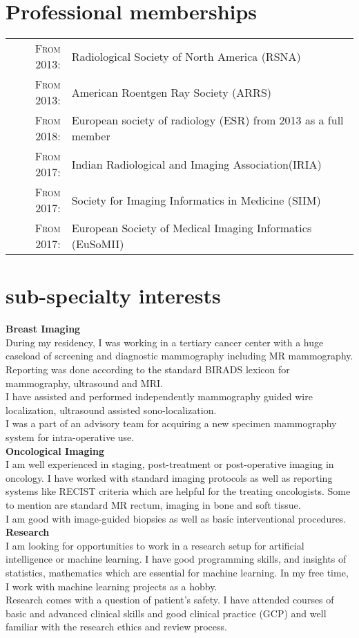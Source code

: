 \documentclass[a4paper,10pt]{article}
\begin{document}
\section{Professional memberships}
\begin{tabular}{rl}
\textsc{From 2013:}&Radiological Society of North America (RSNA)\\
\textsc{From 2013:}&American Roentgen Ray Society (ARRS)\\
\textsc{From 2018:}&European society of radiology (ESR) from 2013 as a full member\\
\textsc{From 2017:}&Indian Radiological and Imaging Association(IRIA) \\
\textsc{From 2017:}&Society for Imaging Informatics in Medicine (SIIM)\\
\textsc{From 2017:}&European Society of Medical Imaging Informatics (EuSoMII)\\
\end{tabular}

\section{sub-specialty  interests}
\textbf{Breast Imaging}\\
During my residency, I was working in a tertiary cancer center with a huge caseload of screening and diagnostic mammography including MR mammography. Reporting was done according to the standard BIRADS lexicon for mammography, ultrasound and MRI. \\
I have assisted and performed independently mammography guided wire localization, ultrasound assisted sono-localization.\\
I was a part of an advisory team for acquiring a new specimen mammography system for intra-operative use.\\

\textbf{Oncological Imaging}\\
I am well experienced in staging, post-treatment or post-operative imaging in oncology. I have worked with standard imaging protocols as well as reporting systems like RECIST criteria which are helpful for the treating oncologists. Some to mention are standard MR rectum, imaging in bone and soft tissue. \\
I am good with image-guided biopsies as well as basic interventional procedures.\\

\textbf{Research}\\
I am looking for opportunities to work in a research setup for artificial intelligence or machine learning. I have good programming skills, and insights of statistics, mathematics which are essential for machine learning. In my free time, I work with machine learning projects as a hobby. \\
Research comes with a question of patient’s safety. I have attended courses of basic and advanced clinical skills and good clinical practice (GCP) and well familiar with the research ethics and review process.\\
\end{document}

